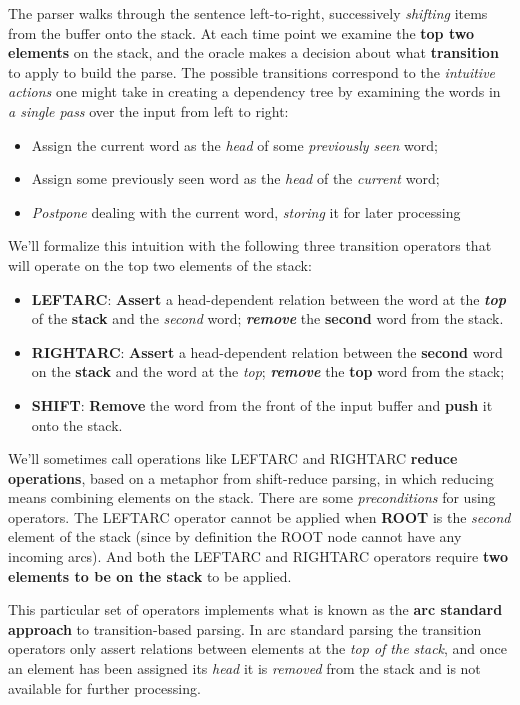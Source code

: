 \documentclass[11pt]{article}
\begin{document}
The parser walks through the sentence left-to-right, successively \emph{shifting} items from the buffer onto the stack. At each time point we examine the \textbf{top two elements} on the stack, and the oracle makes a decision about what \textbf{transition} to apply to build the parse. The possible transitions correspond to the \emph{intuitive actions} one might take in creating a dependency tree by examining the words in \emph{a single pass} over the input from left to right:
\begin{itemize}
\item Assign the current word as the \emph{head} of some \emph{previously seen} word;
\item Assign some previously seen word as the \emph{head} of the \emph{current} word;
\item \emph{Postpone} dealing with the current word, \emph{storing} it for later processing
\end{itemize} We’ll formalize this intuition with the following three transition operators that will operate on the top two elements of the stack:
\begin{itemize}
\item \textbf{LEFTARC}: \textbf{Assert} a head-dependent relation between the word at the \emph{\textbf{top}} of the \textbf{stack} and the \emph{second} word; \emph{\textbf{remove}} the \textbf{second} word from the stack.
\item  \textbf{RIGHTARC}: \textbf{Assert} a head-dependent relation between the \textbf{second} word on the \textbf{stack} and the word at the \emph{top}; \emph{\textbf{remove}} the \textbf{top} word from the stack;
\item  \textbf{SHIFT}: \textbf{Remove} the word from the front of the input buffer and \textbf{push} it onto the stack.
\end{itemize}
We’ll sometimes call operations like LEFTARC and RIGHTARC \textbf{reduce operations}, based on a metaphor from shift-reduce parsing, in which reducing means combining elements on the stack. There are some \emph{preconditions} for using operators. The LEFTARC operator cannot be applied when \textbf{ROOT} is the \emph{second} element of the stack (since by definition the ROOT node cannot have any incoming arcs). And both the LEFTARC and RIGHTARC operators require \textbf{two elements to be on the stack} to be applied.

This particular set of operators implements what is known as the \textbf{arc standard approach} to transition-based parsing. In arc standard
parsing the transition operators only assert relations between elements at the \emph{top of the stack}, and once an element has been assigned its \emph{head} it is \emph{removed} from the stack and is not available for further processing. 
\end{document}
